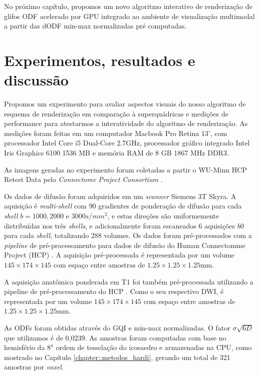 \documentclass[
    12pt,                %
    oneside,            %
    a4paper,            %
    english,            %
    french,                %
    spanish,            %
    brazil                %
    ]{abntex2}
\begin{document}
No próximo capítulo, propomos um novo algoritmo interativo de renderização de glifos ODF acelerado por GPU integrado ao ambiente de visualização multimodal \cite{voltoline2021} a partir das dODF min-max normalizadas pré computadas.







\chapter{Experimentos, resultados e discussão}
\label{sec::experimentos}

Propomos um experimento para avaliar aspectos visuais do nosso algoritmo de esquema de renderização em comparação à superquádricas e medições de performance para atestarmos a interatividade do algoritmo de renderização. As medições foram feitas em um computador Macbook Pro Retina 13', com processador Intel Core i5 Dual-Core 2.7GHz, processador gráfico integrado Intel Iris Graphics 6100 1536 MB e memória RAM de 8 GB 1867 MHz DDR3.

As imagens geradas no experimento foram coletadas a partir o WU-Minn HCP Retest Data pelo \textit{Connectome Project Consortium} \cite{essen2012}.

Os dados de difusão foram adquiridos em um \textit{scanner} Siemens 3T Skyra. A aquisição é \textit{multi-shell} com 90 gradientes de ponderação de difusão para cada \textit{shell} $b = 1000, 2000$ e $3000 s/mm^2$, e estas direções são uniformemente distribuídas nos três \textit{shells}, e adicionalmente foram escaneados 6 aquisições $b0$ para cada \textit{shell}, totalizando 288 volumes. Os dados foram pré-processados com a \textit{pipeline} de pré-processamento para dados de difusão do Human Connectomme Project (HCP) \cite{glasser2013}. A aquisição pré-processada é representada por um volume $145\times 174\times  145$ com espaço entre amostras de $1.25\times 1.25 \times 1.25$mm.

A aquisição anatômica ponderada em T1 foi também pré-processada utilizando a pipeline de pré-processamento do HCP \cite{glasser2013}. Como o seu respectivo DWI, é representada por um volume $145\times 174\times  145$ com espaço entre amostras de $1.25\times 1.25\times 1.25$mm.

As ODFs foram obtidas através do GQI \cite{yeh2010} e min-max normalizadas. O fator $\sigma \sqrt{6D}$ que utilizamos é de 0,0239. As amostras foram computadas com base no hemisfério da $8^{a}$ ordem de tesselação do icosaedro e armazenadas na CPU, como mostrado no Capítulo \ref{chapter::metodos_hardi}, gerando um total de 321 amostras por \textit{voxel}.
\end{document}
